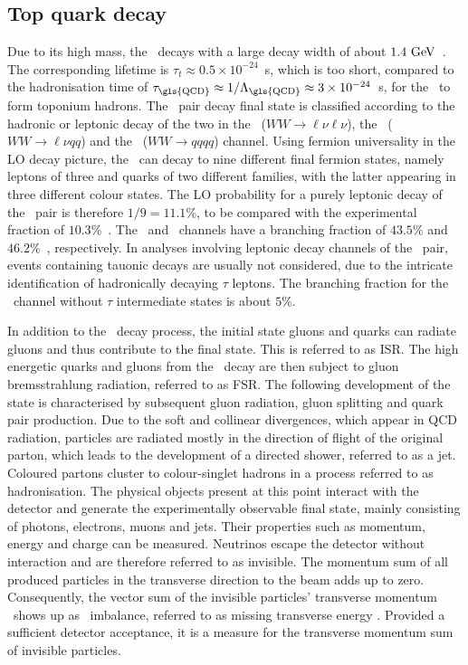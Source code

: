 \subsection{Top quark decay}
%
Due to its high mass, the \tquark\ decays with a large decay width of about $1.4~\mathrm{GeV}$~\cite{PDG2014}. The corresponding lifetime is $\tau_t \approx 0.5 \times 10^{-24}$~s, which is too short, compared to the hadronisation time of $\tau_\mathrm{\gls{QCD}} \approx 1/\Lambda_\mathrm{\gls{QCD}} \approx 3 \times 10^{-24}$~s, for the \tquark\ to form toponium hadrons. 
%
The \tquark\ pair decay final state is classified according to the hadronic or leptonic decay of the two  in the \ttbarll\ ($WW\rightarrow \ell \nu \ell \nu$), the \ttbarlj\ ($WW\rightarrow \ell \nu q q$) and the \ttbarjj\ ($WW\rightarrow q q q q$) channel. Using fermion universality in the \gls{LO} decay picture, the \Wboson\ can decay to nine different final fermion states, namely leptons of three and quarks of two different families, with the latter appearing in three different colour states. The \gls{LO} probability for a purely leptonic decay of the \ttbar\ pair is therefore $1/9=11.1\%$, to be compared with the experimental fraction of $10.3\%$~\cite{PDG2014}. The \ttbarlj\ and \ttbarjj\ channels  have a branching fraction of $43.5\%$ and $46.2\%$~\cite{PDG2014}, respectively. In analyses involving leptonic decay channels of the \ttbar\ pair, events containing tauonic decays are usually not considered, due to the intricate identification of hadronically decaying $\tau$ leptons. The branching fraction for the \ttbarll\ channel without $\tau$ intermediate states is about $5\%$. 


In addition to the \ttbar\ decay process, the initial state gluons and quarks can radiate gluons and thus contribute to the final state. This is referred to as \gls{ISR}.
%
The high energetic quarks and gluons from the \ttbar\ decay are then subject to gluon bremsstrahlung radiation, referred to as \gls{FSR}.
%
The following development of the state is characterised by subsequent gluon radiation, gluon splitting and quark pair production.
%
Due to the soft and collinear divergences, which appear in \gls{QCD} radiation, particles are radiated mostly in the direction of flight of the original parton, which leads to the development of a directed shower, referred to as a jet.
%
Coloured partons cluster to colour-singlet hadrons in a process referred to as hadronisation.
%
%
The physical objects present at this point interact with the detector and generate the experimentally observable final state, mainly consisting of photons, electrons, muons and jets. Their properties such as momentum, energy and charge can be measured. 
%
Neutrinos escape the detector without interaction and are therefore referred to as invisible. The momentum sum of all produced particles in the transverse direction to the beam adds up to zero. Consequently, the vector sum of the invisible particles' transverse momentum \pt\ shows up as \pt\ imbalance, referred to as missing transverse energy \met. Provided a sufficient detector acceptance, it is a measure for the transverse momentum sum of invisible particles.




